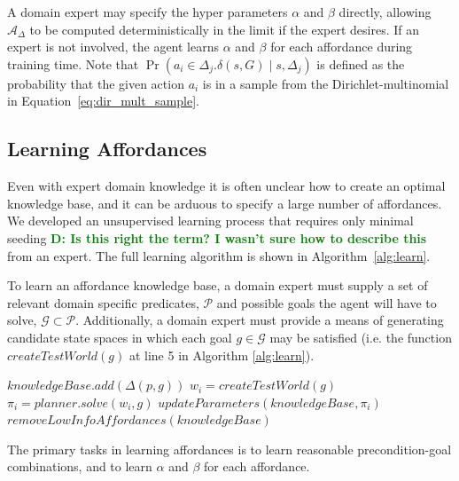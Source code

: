\documentclass[conference]{IEEEtran}
\newcommand{\dnote}[1]{\textcolor{Green}{\textbf{D: #1}}}
\begin{document}
A domain expert may specify the hyper parameters $\alpha$ and $\beta$ directly,
allowing $\mathcal{A_\Delta}$ to be computed deterministically in the limit if 
the expert desires. If an expert is not involved, the agent learns $\alpha$ and
$\beta$ for each affordance during training time. Note that $\Pr(a_i \in \Delta_j.\delta(s,G) \mid s, \Delta_j)$ is
defined as the probability that the given action $a_i$ is in a sample from the Dirichlet-multinomial
in Equation~\ref{eq:dir_mult_sample}.

\subsection{Learning Affordances}

Even with expert domain knowledge it is often unclear how to create
an optimal knowledge base, and it can be arduous to specify a 
large number of affordances. We developed an unsupervised learning
process that requires only minimal seeding \dnote{Is this right the term? I wasn't sure how to describe this} from an expert.
The full learning algorithm is shown in Algorithm~\ref{alg:learn}.

To learn an affordance knowledge base, a domain 
expert must supply a set of relevant domain specific predicates,
$\mathcal{P}$ and possible goals the agent will have to solve, $\mathcal{G}
\subset \mathcal{P}$. Additionally, a domain expert must provide a means 
of generating candidate state spaces in which each goal $g \in \mathcal{G}$
may be satisfied (i.e. the function $createTestWorld(g)$ at line 5 in Algorithm \ref{alg:learn}).

\begin{algorithm}
  \caption{$learn(\mathcal{P}, \mathcal{G})$}
  \begin{algorithmic}[1]
    \State $knowledgeBase.add(\Delta(p,g))$
    \EndFor
    \State $w_i = createTestWorld(g)$
    \State $\pi_i = planner.solve(w_i, g)$
    \State $updateParameters(knowledgeBase, \pi_i)$
    \EndFor
    \State $removeLowInfoAffordances(knowledgeBase)$
  \end{algorithmic}
  \label{alg:learn}
\end{algorithm}

The primary tasks in learning affordances is to learn reasonable precondition-goal 
combinations, and to learn $\alpha$ and $\beta$ for each affordance. 
\end{document}
